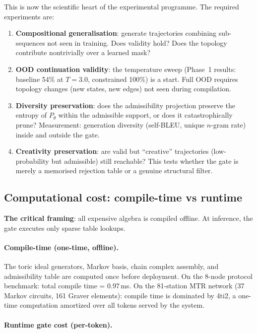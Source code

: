 \documentclass[11pt,a4paper]{article}
\begin{document}
This is now the scientific heart of the experimental programme.
The required experiments are:
\begin{enumerate}[label=(\roman*)]
  \item \textbf{Compositional generalisation}: generate trajectories
        combining sub-sequences not seen in training.
        Does validity hold? Does the topology contribute nontrivially
        over a learned mask?
  \item \textbf{OOD continuation validity}: the temperature sweep
        (Phase~1 results: baseline 54\% at $T=3.0$, constrained
        100\%) is a start. Full OOD requires topology changes
        (new states, new edges) not seen during compilation.
  \item \textbf{Diversity preservation}: does the admissibility
        projection preserve the entropy of $P_\theta$ within the
        admissible support, or does it catastrophically prune?
        Measurement: generation diversity (self-BLEU, unique
        $n$-gram rate) inside and outside the gate.
  \item \textbf{Creativity preservation}: are valid but
        ``creative'' trajectories (low-probability but admissible)
        still reachable? This tests whether the gate is merely
        a memorised rejection table or a genuine structural filter.
\end{enumerate}

\subsection{Computational cost: compile-time vs runtime}

\textbf{The critical framing}: all expensive algebra is compiled offline.
At inference, the gate executes only sparse table lookups.

\paragraph{Compile-time (one-time, offline).}
The toric ideal generators, Markov basis, chain complex assembly,
and admissibility table are computed once before deployment.
On the 8-node protocol benchmark: total compile time = 0.97\,ms.
On the 81-station MTR network (37 Markov circuits, 161 Graver elements):
compile time is dominated by 4ti2, a one-time computation amortized
over all tokens served by the system.

\paragraph{Runtime gate cost (per-token).}
\end{document}
